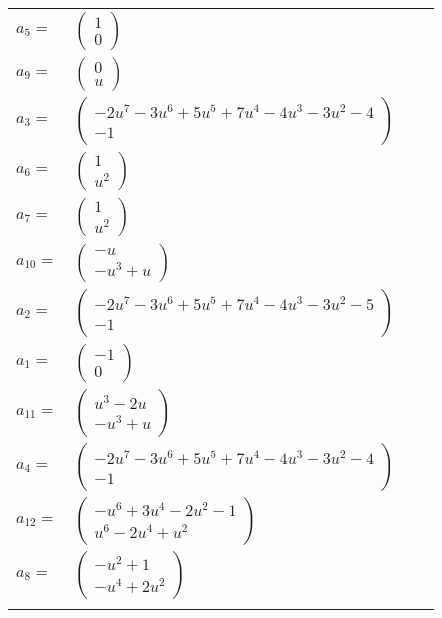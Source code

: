 \documentclass[1p]{elsarticle_modified}
\theoremstyle{definition}
\begin{document}
\begin{tabular}{m{7pt} m{180pt} m{7pt} m{180pt} }
\flushright $a_{5}=$&$\begin{pmatrix}1\\0\end{pmatrix}$ \\
\flushright $a_{9}=$&$\begin{pmatrix}0\\u\end{pmatrix}$ \\
\flushright $a_{3}=$&$\begin{pmatrix}-2 u^7-3 u^6+5 u^5+7 u^4-4 u^3-3 u^2-4\\-1\end{pmatrix}$ \\
\flushright $a_{6}=$&$\begin{pmatrix}1\\u^2\end{pmatrix}$ \\
\flushright $a_{7}=$&$\begin{pmatrix}1\\u^2\end{pmatrix}$ \\
\flushright $a_{10}=$&$\begin{pmatrix}- u\\- u^3+u\end{pmatrix}$ \\
\flushright $a_{2}=$&$\begin{pmatrix}-2 u^7-3 u^6+5 u^5+7 u^4-4 u^3-3 u^2-5\\-1\end{pmatrix}$ \\
\flushright $a_{1}=$&$\begin{pmatrix}-1\\0\end{pmatrix}$ \\
\flushright $a_{11}=$&$\begin{pmatrix}u^3-2 u\\- u^3+u\end{pmatrix}$ \\
\flushright $a_{4}=$&$\begin{pmatrix}-2 u^7-3 u^6+5 u^5+7 u^4-4 u^3-3 u^2-4\\-1\end{pmatrix}$ \\
\flushright $a_{12}=$&$\begin{pmatrix}- u^6+3 u^4-2 u^2-1\\u^6-2 u^4+u^2\end{pmatrix}$ \\
\flushright $a_{8}=$&$\begin{pmatrix}- u^2+1\\- u^4+2 u^2\end{pmatrix}$\\&\end{tabular}
\end{document}

